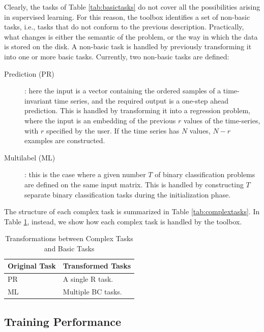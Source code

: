 Clearly, the tasks of Table \ref{tab:basictasks} do not cover all the possibilities arising in supervised learning. For this reason, the toolbox identifies a set of non-basic tasks, i.e., tasks that do not conform to the previous description. Practically, what changes is either the semantic of the problem, or the way in which the data is stored on the disk. A non-basic task is handled by previously transforming it into one or more basic tasks. Currently, two non-basic tasks are defined: 

\begin{description}
\item[Prediction (PR)]: here the input is a vector containing the ordered samples of a time-invariant time series, and the required output is a one-step ahead prediction. This is handled by transforming it into a regression problem, where the input is an embedding of the previous $r$ values of the time-series, with $r$ specified by the user. If the time series has $N$ values, $N-r$ examples are constructed.

\item[Multilabel (ML)]: this is the case where a given number $T$ of binary classification problems are defined on the same input matrix. This is handled by constructing $T$ separate binary classification tasks during the initialization phase.
\end{description}

The structure of each complex task is summarized in Table \ref{tab:complextasks}. In Table \ref{tab:correspondeces}, instead, we show how each complex task is handled by the toolbox.

\begin{center}
\begin{table}[t]
{\centering\hfill{}
\begin{tabular}{ll}
\toprule
Original Task & Transformed Tasks \\ 
\midrule
PR & A single R task.  \\
ML & Multiple BC tasks. \\
\bottomrule
\end{tabular}}
\hfill{}
\caption{Transformations between Complex Tasks and Basic Tasks}
\label{tab:correspondeces}
\end{table}
\end{center}

\subsection{Training Performance}

